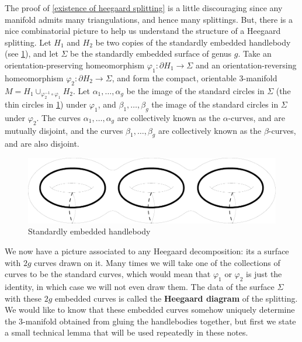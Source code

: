The proof of \cref{existence of heegaard splitting} is a little discouraging since any manifold admits many triangulations, and hence many splittings. But, there is a nice combinatorial picture to help us understand the structure of a Heegaard splitting. Let $H_1$ and $H_2$ be two copies of the standardly embedded handlebody (see \cref{standardly embedded handlebody}), and let $\Sigma$ be the standardly embedded surface of genus $g$. Take an orientation-preserving homeomorphism $\varphi_1 : \partial H_1 \rightarrow \Sigma$ and an orientation-reversing homeomorphism $\varphi_2 : \partial H_2 \rightarrow \Sigma$, and form the compact, orientable 3-manifold $M = H_1 \cup_{\varphi_2^{-1} \circ \varphi_1} H_2$. Let $\alpha_1,\ldots,\alpha_g$ be the image of the standard circles in $\Sigma$ (the thin circles in \cref{standardly embedded handlebody}) under $\varphi_1$, and $\beta_1,\ldots,\beta_g$ the image of the standard circles in $\Sigma$ under $\varphi_2$. The curves $\alpha_1,\ldots,\alpha_g$ are collectively known as the $\alpha$-curves, and are mutually disjoint, and the curves $\beta_1,\ldots,\beta_g$ are collectively known as the $\beta$-curves, and are also disjoint. 

\begin{figure}[tb]
\centering
\includegraphics[scale=.5]{graphics/standardhandlebody}
\caption{Standardly embedded handlebody}
\label{standardly embedded handlebody}
\end{figure}


We now have a picture associated to any Heegaard decomposition: its a surface with $2g$ curves drawn on it. Many times we will take one of the collections of curves to be the standard curves, which would mean that $\varphi_1$ or $\varphi_2$ is just the identity, in which case we will not even draw them. The data of the surface $\Sigma$ with these $2g$ embedded curves is called the \textbf{Heegaard diagram} of the splitting. We would like to know that these embedded curves somehow uniquely determine the 3-manifold obtained from gluing the handlebodies together, but first we state a small technical lemma that will be used repeatedly in these notes.

